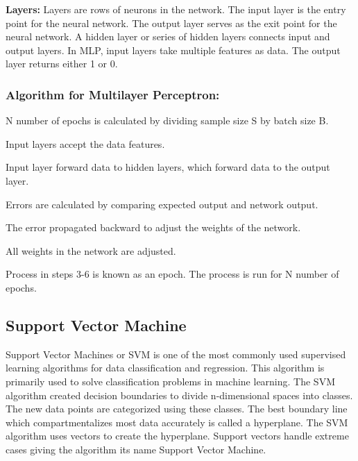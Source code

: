 \vspace{-1em}
\textbf{Layers:}
Layers are rows of neurons in the network. The input layer is the entry point for the neural
network. The output layer serves as the exit point for the neural network. A hidden layer or
series of hidden layers connects input and output layers. In MLP, input layers take multiple
features as data. The output layer returns either 1 or 0.

\subsubsection{Algorithm for Multilayer Perceptron:}
\begin{steps}
    \vspace{-0.5em}
    \setlength{\itemsep}{-0.2em}
    \item N number of epochs is calculated by dividing sample size S by batch size B.
    \item Input layers accept the data features.
    \item Input layer forward data to hidden layers, which forward data to the output layer.
    \item Errors are calculated by comparing expected output and network output.
    \item The error propagated backward to adjust the weights of the network.
    \item All weights in the network are adjusted.
    \item Process in steps 3-6 is known as an epoch. The process is run for N number of epochs.
    \vspace{-1em}
\end{steps}

\vspace{-2em}
\subsection{Support Vector Machine} \label{subsec:support_vector_machine}
Support Vector Machines or SVM is one of the most commonly used supervised learning algorithms
for data classification and regression. This algorithm is primarily used to solve
classification problems in machine learning. The SVM algorithm created decision boundaries to
divide n-dimensional spaces into classes. The new data points are categorized using these
classes. The best boundary line which compartmentalizes most data accurately is called a
hyperplane. The SVM algorithm uses vectors to create the hyperplane. Support vectors handle
extreme cases giving the algorithm its name Support Vector Machine.

